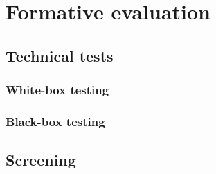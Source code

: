 \chapter{Formative evaluation}
\label{ch:evaluation}

\section{Technical tests}

\subsection{White-box testing}

\subsection{Black-box testing}

\section{Screening}
